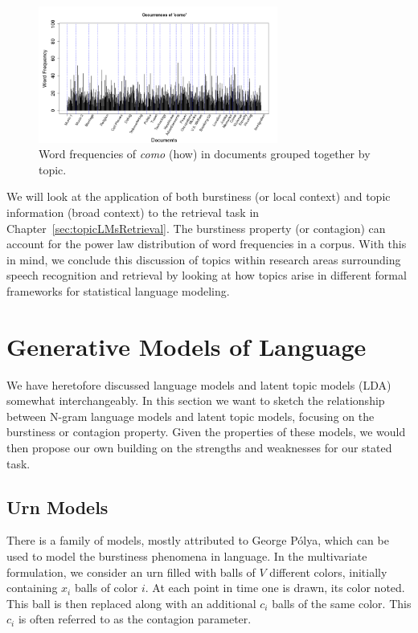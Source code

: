 \begin{figure}
\begin{center}
\includegraphics[width=0.7\textwidth]{graphs/freq-como.png}
\caption[Word frequencies of \textit{como} by topic]{Word frequencies of \textit{como} (how) in documents grouped together by topic.\label{freqComo}}
\end{center}
\end{figure}

We will look at the application of both burstiness (or local context) and topic information (broad context) to the retrieval task in Chapter~\ref{sec:topicLMsRetrieval}.  The burstiness property (or contagion) can account for the power law distribution of word frequencies in a corpus.  With this in mind, we conclude this discussion of topics within research areas surrounding speech recognition and retrieval by looking at how topics arise in different formal frameworks for statistical language modeling.  


\section{Generative Models of Language}
We have heretofore discussed language models and latent topic models (LDA) somewhat  interchangeably.  In this section we want to sketch the relationship between N-gram language models and latent topic models, focusing on the burstiness or contagion property.   Given the properties of these models, we would then propose our own building on the strengths and weaknesses for our stated task.

\subsection{Urn Models}

There is a family of models, mostly attributed to George Pólya, which can be used to model the burstiness phenomena in language.   In the multivariate formulation, we consider an urn filled with balls of $V$ different colors, initially containing $x_i$ balls of color $i$.  At each point in time one is drawn, its color noted.  This ball is then replaced along with an additional $c_i$ balls of the same color.  This $c_i$ is often referred to as the contagion parameter.  

